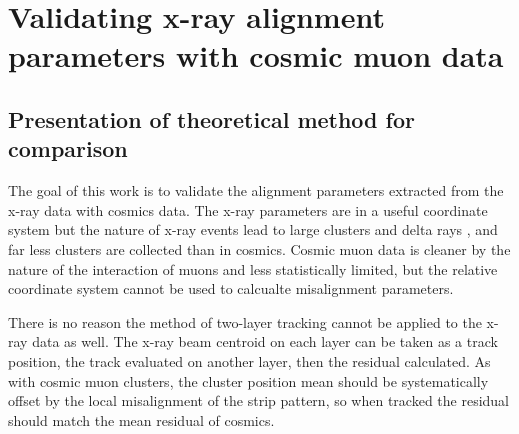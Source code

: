 
\chapter{Validating x-ray alignment parameters with cosmic muon data}

\section{Presentation of theoretical method for comparison}

The goal of this work is to validate the alignment parameters extracted from the x-ray data with cosmics data. 
The x-ray parameters are in a useful coordinate system but the nature of x-ray events lead to large clusters and delta rays \cite{lefebvre_precision_2020}, and far less clusters are collected than in cosmics. Cosmic muon data is cleaner by the nature of the interaction of muons and less statistically limited, but the relative coordinate system cannot be used to calcualte misalignment parameters. 

There is no reason the method of two-layer tracking cannot be applied to the x-ray data as well. The x-ray beam centroid on each layer can be taken as a track position, the track evaluated on another layer, then the residual calculated. As with cosmic muon clusters, the cluster position mean should be systematically offset by the local misalignment of the strip pattern, so when tracked the residual should match the mean residual of cosmics. 


